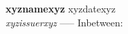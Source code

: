 \item \textbf{xyznamexyz} \hfill xyzdatexyz \\[-2pt]
\textit{xyzissuerxyz}
-----
Inbetween: \vspace{3pt}
